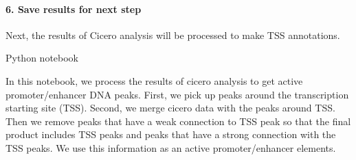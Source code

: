 \documentclass[letterpaper,10pt,english]{sphinxmanual}
\begin{document}
\paragraph{6. Save results for next step}
\label{\detokenize{notebooks/01_ATAC-seq_data_processing/option1_scATAC-seq_data_analysis_with_cicero/01_atacdata_to_cicero:6.-Save-results-for-next-step}}
{
%
\begin{sphinxVerbatim}[commandchars=\\\{\}]
\llap{\color{nbsphinxin}[ ]:\,\hspace{\fboxrule}\hspace{\fboxsep}}  
      
      
\end{sphinxVerbatim}
}

Next, the results of Cicero analysis will be processed to make TSS annotations.

Python notebook

In this notebook, we process the results of cicero analysis to get active promoter/enhancer DNA peaks. First, we pick up peaks around the transcription starting site (TSS). Second, we merge cicero data with the peaks around TSS. Then we remove peaks that have a weak connection to TSS peak so that the final product includes TSS peaks and peaks that have a strong connection with the TSS peaks. We use this information as an active promoter/enhancer elements.
\end{document}
